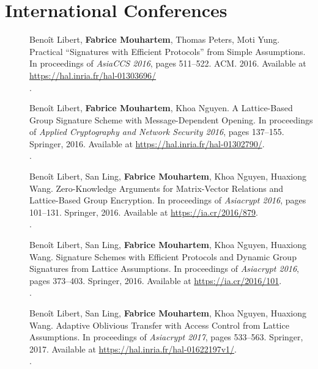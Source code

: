 \section*{International Conferences}
\begin{description}
  \item[\cite{LMPY16}] Benoît Libert, \textbf{Fabrice Mouhartem}, Thomas Peters, Moti Yung.
    Practical ``Signatures with Efficient Protocols'' from Simple Assumptions.
    In proceedings of \textit{AsiaCCS 2016}, pages 511--522. ACM. 2016.
    Available at \url{https://hal.inria.fr/hal-01303696/}\\
    .
  \item[\cite{LMN16}] Benoît Libert, \textbf{Fabrice Mouhartem}, Khoa Nguyen.
    A Lattice-Based Group Signature Scheme with Message-Dependent Opening.
    In proceedings of \textit{Applied Cryptography and Network Security 2016}, pages {137--155}. Springer, 2016.
    Available at \url{https://hal.inria.fr/hal-01302790/}.\\
    .
  \item[\cite{LLM+16a}] Benoît Libert, San Ling, \textbf{Fabrice Mouhartem}, Khoa Nguyen, Huaxiong Wang.
    Zero-Knowledge Arguments for Matrix-Vector Relations and Lattice-Based Group Encryption.
    In proceedings of \textit{Asiacrypt 2016}, pages 101--131. Springer, 2016.
    Available at \url{https://ia.cr/2016/879}.\\
    .
  \item[\cite{LLM+16}] Benoît Libert, San Ling, \textbf{Fabrice Mouhartem}, Khoa Nguyen, Huaxiong Wang.
    Signature Schemes with Efficient Protocols and Dynamic Group Signatures from Lattice Assumptions.
    In proceedings of \textit{Asiacrypt 2016}, pages 373--403. Springer, 2016.
    Available at \url{https://ia.cr/2016/101}.\\
    .
  \item[\cite{LLM+17}] Benoît Libert, San Ling, \textbf{Fabrice Mouhartem}, Khoa Nguyen, Huaxiong Wang.
    Adaptive Oblivious Transfer with Access Control from Lattice Assumptions.
    In proceedings of \textit{Asiacrypt 2017}, pages 533--563. Springer, 2017.
    Available at \url{https://hal.inria.fr/hal-01622197v1/}.\\
    .
\end{description}
